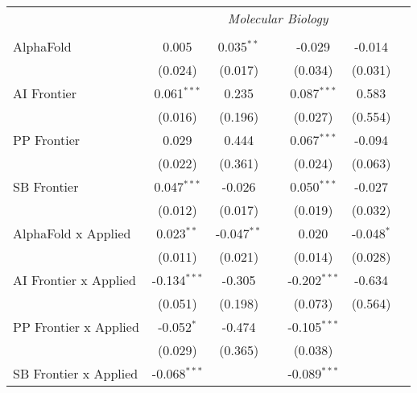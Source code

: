 \begin{tabular}{lcccccc}
 & \multicolumn{6}{c}{\textit{Molecular Biology}} \\ \\
   AlphaFold                      & 0.005          & 0.035$^{**}$  &               & -0.029         & -0.014       &   \\   
                                  & (0.024)        & (0.017)       &               & (0.034)        & (0.031)      &   \\   
   AI Frontier                    & 0.061$^{***}$  & 0.235         &               & 0.087$^{***}$  & 0.583        &   \\   
                                  & (0.016)        & (0.196)       &               & (0.027)        & (0.554)      &   \\   
   PP Frontier                    & 0.029          & 0.444         &               & 0.067$^{***}$  & -0.094       &   \\   
                                  & (0.022)        & (0.361)       &               & (0.024)        & (0.063)      &   \\   
   SB Frontier                    & 0.047$^{***}$  & -0.026        &               & 0.050$^{***}$  & -0.027       &   \\   
                                  & (0.012)        & (0.017)       &               & (0.019)        & (0.032)      &   \\   
   AlphaFold x Applied            & 0.023$^{**}$   & -0.047$^{**}$ &               & 0.020          & -0.048$^{*}$ &   \\   
                                  & (0.011)        & (0.021)       &               & (0.014)        & (0.028)      &   \\   
   AI Frontier x Applied          & -0.134$^{***}$ & -0.305        &               & -0.202$^{***}$ & -0.634       &   \\   
                                  & (0.051)        & (0.198)       &               & (0.073)        & (0.564)      &   \\   
   PP Frontier x Applied          & -0.052$^{*}$   & -0.474        &               & -0.105$^{***}$ &              &   \\   
                                  & (0.029)        & (0.365)       &               & (0.038)        &              &   \\   
   SB Frontier x Applied          & -0.068$^{***}$ &               &               & -0.089$^{***}$ &              &   \\   

\end{tabular}

